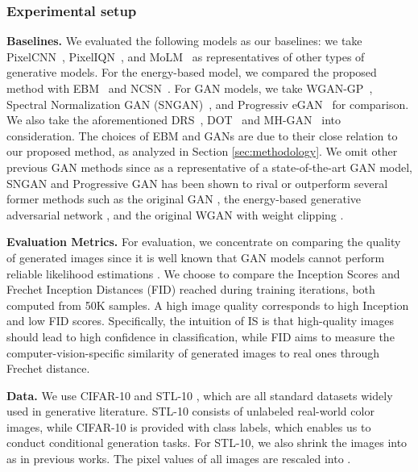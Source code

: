 \documentclass{article}
\begin{document}
\subsubsection{Experimental setup}

\textbf{Baselines.} 
We evaluated the following models as our baselines: we take PixelCNN~\cite{van2016conditional}, PixelIQN~\cite{ostrovski2018autoregressive}, and MoLM~\cite{ravuri2018learning} as representatives of other types of generative models. For the energy-based model, we compared the proposed method with EBM~\cite{du2019implicit} and NCSN~\cite{song2019generative}. For GAN models, we take WGAN-GP~\cite{gulrajani2017improved}, Spectral Normalization GAN (SNGAN)~\cite{miyato2018spectral}, and Progressiv eGAN~\cite{karras2017progressive} for comparison. We also take the aforementioned DRS~\cite{azadi2018discriminator}, DOT~\cite{tanaka2019discriminator} and MH-GAN~\cite{turner2018metropolis} into consideration. The choices of EBM and GANs are due to their close relation to our proposed method, as analyzed in Section \ref{sec:methodology}. We omit other previous GAN methods since as a representative of a state-of-the-art GAN model, SNGAN and Progressive GAN has been shown to rival or outperform several former methods such as the original GAN \cite{goodfellow2014generative}, the energy-based generative adversarial network \cite{zhao2016energy}, and the original WGAN with weight clipping \cite{arjovsky2017wasserstein}.

\textbf{Evaluation Metrics.}
For evaluation, we concentrate on comparing the quality of generated images since it is well known that GAN models cannot perform reliable likelihood estimations \cite{theis2015note}. We choose to compare the Inception Scores \cite{salimans2016improved} and Frechet Inception Distances (FID) \cite{heusel2017gans} reached during training iterations, both computed from 50K samples. A high image quality corresponds to high Inception and low FID scores. 
Specifically, the intuition of IS is that high-quality images should lead to high confidence in classification, while FID aims to measure the computer-vision-specific similarity of generated images to real ones through Frechet distance.

\textbf{Data.}
We use CIFAR-10 \cite{krizhevsky2009learning} and STL-10 \cite{coates2011analysis}, which are all standard datasets widely used in generative literature. STL-10 consists of
unlabeled real-world color images, while CIFAR-10 is provided with class labels, which enables us to conduct conditional generation tasks. For STL-10, we also shrink the images into  as in previous works. The pixel values of all images are rescaled into .
\end{document}
